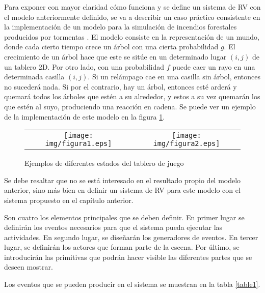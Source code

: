 \documentclass{egpubl}
\begin{document}
Para exponer con mayor claridad c\'omo funciona y se define un
sistema de RV con el modelo anteriormente definido, se va a describir 
un caso pr\'actico consistente en la implementaci\'on de un 
modelo para la simulaci\'on de incendios forestales producidos por 
tormentas \cite{John2007}. El modelo consiste en la
representaci\'on de un mundo, donde cada cierto tiempo crece un \'arbol
con una cierta probabilidad $g$. El crecimiento de un \'arbol hace que
este se sit\'ue en un determinado lugar $(i,j)$ de un tablero 2D. Por
otro lado, con una probabilidad $f$ puede caer un rayo en una determinada
casilla $(i,j)$. Si un rel\'ampago cae en una casilla sin \'arbol,
entonces no suceder\'a nada. Si por el contrario, hay un \'arbol,
entonces est\'e arder\'a y quemar\'a todos los \'arboles que est\'en a
su alrededor, y estos a su vez quemar\'an los que est\'en al suyo,
produciendo una reacci\'on en cadena. Se puede ver un ejemplo de la
implementaci\'on de este modelo en la figura \ref{fig:ejemplo}.


\begin{figure}[htb]
  	\centering
	\begin{tabular}{cc}
  		\texttt{[image: img/figura1.eps]} &
		\texttt{[image: img/figura2.eps]}
	\end{tabular}
 	\caption{\label{fig:ejemplo} Ejemplos de diferentes estados del tablero de juego}
\end{figure}

Se debe resaltar que no se est\'a interesado en el resultado propio del
modelo anterior, sino m\'as bien en definir un sistema de RV para este
modelo con el sistema propuesto en el cap\'itulo anterior.

Son cuatro los elementos principales que se deben definir. En primer
lugar se definir\'an los eventos necesarios para que el sistema pueda
ejecutar las actividades. En segundo lugar, se dise\~nar\'an los
generadores de eventos. En tercer lugar, se definir\'an los actores que
forman parte de la escena. Por \'ultimo, se introducir\'an las
primitivas que podr\'an hacer visible las diferentes partes que se
deseen mostrar.

Los eventos que se pueden producir en el sistema se muestran en la tabla \ref{table1}.
\end{document}
